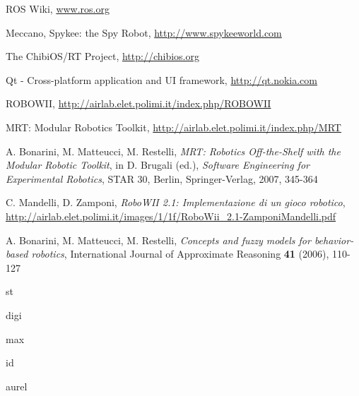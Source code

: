 \begin{thebibliography}{9}

  ROS Wiki, \url{www.ros.org}

  Meccano, Spykee: the Spy Robot, \url{http://www.spykeeworld.com}

  The ChibiOS/RT Project, \url{http://chibios.org}

	Qt - Cross-platform application and UI framework, \url{http://qt.nokia.com}

  ROBOWII, \url{http://airlab.elet.polimi.it/index.php/ROBOWII}

  MRT: Modular Robotics Toolkit, \url{http://airlab.elet.polimi.it/index.php/MRT}

  A. Bonarini, M. Matteucci, M. Restelli, \emph{MRT: Robotics Off-the-Shelf with the Modular Robotic Toolkit},
  in D. Brugali (ed.), \emph{Software Engineering for Experimental Robotics}, STAR 30, Berlin, Springer-Verlag, 2007, 345-364

  C. Mandelli, D. Zamponi, \emph{RoboWII 2.1: Implementazione di un gioco robotico}, \url{http://airlab.elet.polimi.it/images/1/1f/RoboWii_2.1-ZamponiMandelli.pdf}

  A. Bonarini, M. Matteucci, M. Restelli, \emph{Concepts and fuzzy models for behavior-based robotics}, International Journal of Approximate Reasoning \textbf{41} (2006), 110-127

  st

  digi
  
  max
  
  id
  
  aurel
    

\end{thebibliography}